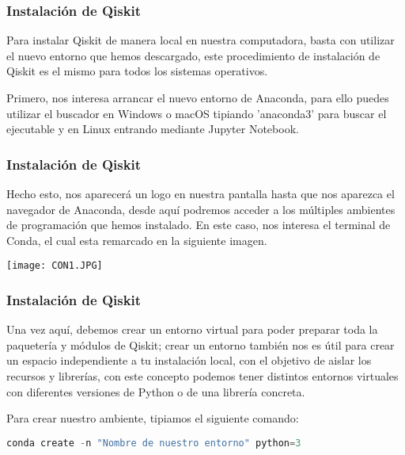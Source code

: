 \documentclass[spanish]{beamer}
\begin{document}
\begin{frame}[fragile]\frametitle{Instalación de Qiskit}
\justify\setlength{\parskip}{5mm}
Para instalar Qiskit de manera local en nuestra computadora, basta con utilizar el nuevo entorno que hemos descargado, este procedimiento de instalación de Qiskit es el mismo para todos los sistemas operativos.

Primero, nos interesa arrancar el nuevo entorno de Anaconda, para ello puedes utilizar el buscador en Windows o macOS tipiando 'anaconda3' para buscar el ejecutable y en Linux entrando mediante Jupyter Notebook.
\end{frame}
\begin{frame}[fragile]\frametitle{Instalación de Qiskit}
\justify\setlength{\parskip}{5mm}
Hecho esto, nos aparecerá un logo en nuestra pantalla hasta que nos aparezca el navegador de Anaconda, desde aquí podremos acceder a los múltiples ambientes de programación que hemos instalado. En este caso, nos interesa el terminal de Conda, el cual esta remarcado en la siguiente imagen.

\centering\texttt{[image: CON1.JPG]}

\end{frame}
\begin{frame}[fragile]\frametitle{Instalación de Qiskit}
\justify\setlength{\parskip}{5mm}
Una vez aquí, debemos crear un entorno virtual para poder preparar toda la paquetería y módulos de Qiskit; crear un entorno también nos es útil para crear un espacio independiente a tu instalación local, con el objetivo de aislar los recursos y librerías, con este concepto podemos tener distintos entornos virtuales con diferentes versiones de Python o de una librería concreta.

Para crear nuestro ambiente, tipiamos el siguiente comando:
\begin{lstlisting}[language=c++]
conda create -n "Nombre de nuestro entorno" python=3\end{lstlisting}
\end{frame}
\end{document}
